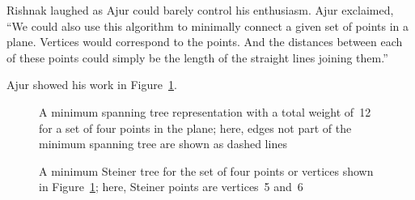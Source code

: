 Rishnak laughed as Ajur could barely control his enthusiasm. Ajur exclaimed, ``We could also use this algorithm to minimally connect a given set of points in a plane. Vertices would correspond to the points. And the distances between each of these points could simply be the length of the straight lines joining them.''

Ajur showed his work in Figure~\ref{11g9}.

\begin{figure}
\begin{center}
\caption{A minimum spanning tree representation with a total weight of~12 for a set of four points in the plane; here, edges not part of the minimum spanning tree are shown as dashed lines}\label{11g9}
\end{center}
\end{figure}

\begin{figure}
\begin{center}
\caption{A minimum Steiner tree for the set of four points or vertices shown in Figure~\ref{11g9}; here, Steiner points are vertices~5 and~6}\label{11g10}
\end{center}
\end{figure}

